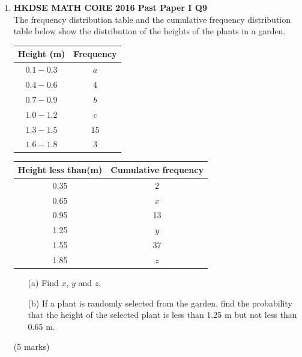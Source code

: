 \documentclass[12pt]{article}
\begin{document}
\begin{enumerate}
	\item \textbf{HKDSE MATH CORE 2016 Past Paper I Q9}\\
	The frequency distribution table and the cumulative frequency distribution table below show the distribution of the heights of the plants in a garden.
	\begin{table}[h]
		\centering
		\begin{minipage}{.45\textwidth}
		  \centering
		  \begin{tabular}{ | c | c | }
			\hline
			Height (m) & Frequency \\
			\hline
			$0.1 - 0.3$ & $a$ \\
			\hline
			$0.4 - 0.6$ & $4$ \\
			\hline
			$0.7 - 0.9$ & $b$ \\
			\hline
			$1.0 - 1.2$ & $c$ \\
			\hline
			$1.3 - 1.5$ & $15$ \\
			\hline
			$1.6 - 1.8$ & $3$ \\
			\hline
		  \end{tabular}
		\end{minipage}
		\hfill
		\begin{minipage}{.5\textwidth}
		  \centering
		  \begin{tabular}{ | c | c | }
			\hline
			Height less than(m)&Cumulative frequency\\
			\hline
			0.35 & 2 \\
			\hline
			0.65 & $x$ \\
			\hline
			0.95 & 13 \\
			\hline
			1.25 & $y$ \\
			\hline
			1.55 & 37 \\
			\hline
			1.85 & $z$ \\
			\hline
		  \end{tabular}
		\end{minipage}
		\label{tab:two_tables}
	\end{table}
	\begin{enumerate}
		\item[(a)] Find $x$, $y$ and $z$.
		\item[(b)] If a plant is randomly selected from the garden, find the probability that the height of the selected plant is less than 1.25 m but not less than 0.65 m.
	\end{enumerate}
	(5 marks)


\end{enumerate}
\end{document}
